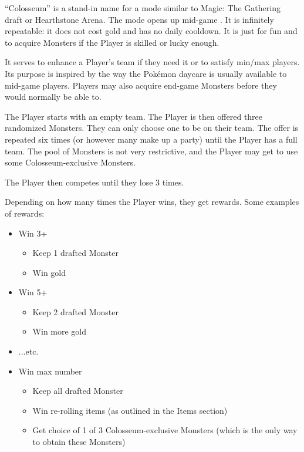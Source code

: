 ``Colosseum'' is a stand-in name for a mode similar to Magic: The Gathering draft or Hearthstone Arena. The mode opens up mid-game . It is infinitely repeatable: it does not cost gold and has no daily cooldown. It is just for fun and to acquire Monsters if the Player is skilled or lucky enough.

It serves to enhance a Player's team if they need it or to satisfy min/max players. Its purpose is inspired by the way the Pok\'{e}mon daycare is usually available to mid-game players. Players may also acquire end-game Monsters before they would normally be able to.

The Player starts with an empty team. The Player is then offered three randomized Monsters. They can only choose one to be on their team. The offer is repeated six times (or however many make up a party) until the Player has a full team. The pool of Monsters is not very restrictive, and the Player may get to use some Colosseum-exclusive Monsters.

The Player then competes until they lose 3  times.

Depending on how many times the Player wins, they get rewards. Some examples of rewards:
\begin{itemize}
	\item{Win 3+
		\begin{itemize}
			\item{Keep 1 drafted Monster}
			\item{Win gold}
		\end{itemize}
	}
	\item{Win 5+
		\begin{itemize}
			\item{Keep 2 drafted Monster}
			\item{Win more gold}
		\end{itemize}
	}
	\item{...etc.}
	\item{Win max number 
		\begin{itemize}
			\item{Keep all drafted Monster}
			\item{Win re-rolling items (as outlined in the Items section)}
			\item{Get choice of 1 of 3 Colosseum-exclusive Monsters (which is the only way to obtain these Monsters)}
		\end{itemize}
	}
\end{itemize}

\newpage

\printbibliography

